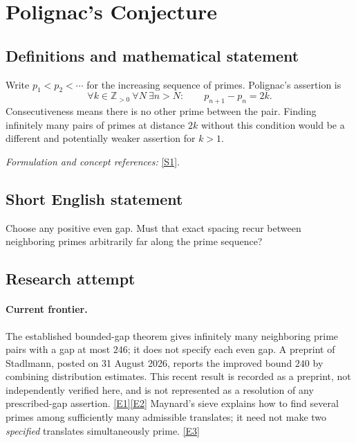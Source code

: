 \documentclass[11pt,a4paper]{article}
\newcommand{\Z}{\mathbb{Z}}
\newcommand{\sref}[2]{\hyperlink{source:#1:#2}{[S#2]}}
\newcommand{\eref}[2]{\hyperlink{extra:#1:#2}{[E#2]}}
\newif\ifshowcatalogue
\newcommand{\cataloguescope}[1]{\ifshowcatalogue
 \paragraph{Exact scope in the supplied catalogue.}
 \begin{quote}\small #1\end{quote}\fi}
\numberwithin{equation}{section}
\begin{document}
\setcounter{section}{0}
\clearpage
\section*{\texorpdfstring{Polignac's Conjecture}{Polignac's Conjecture}}\label{statement}
\subsection{Definitions and mathematical statement}
Write $p_1<p_2<\cdots$ for the increasing sequence of primes. Polignac's assertion is
\[
 \forall k\in\Z_{>0}\ \forall N\ \exists n>N:\qquad p_{n+1}-p_n=2k.
\]
Consecutiveness means there is no other prime between the pair. Finding infinitely many pairs of primes at distance $2k$ without this condition would be a different and potentially weaker assertion for $k>1$.
\par\smallskip\textit{Formulation and concept references:} \sref{statement}{1}.
\cataloguescope{For every positive even integer 2k, there are infinitely many pairs of consecutive primes whose difference is 2k.}
\subsection{Short English statement}
Choose any positive even gap. Must that exact spacing recur between neighboring primes arbitrarily far along the prime sequence?
\subsection{Research attempt}

\paragraph{Current frontier.}
The established bounded-gap theorem gives infinitely many neighboring prime
pairs with a gap at most $246$; it does not specify each even gap. A preprint
of Stadlmann, posted on 31 August 2026, reports the improved bound $240$ by
combining distribution estimates. This recent result is recorded as a
preprint, not independently verified here, and is not represented as a
resolution of any prescribed-gap assertion. \eref{statement}{1}\eref{statement}{2}
Maynard's sieve explains how to find several primes among sufficiently many
admissible translates; it need not make two \emph{specified} translates
simultaneously prime. \eref{statement}{3}
\end{document}
